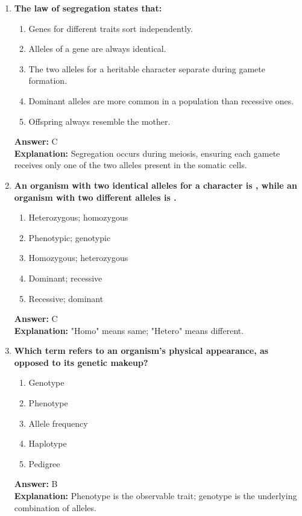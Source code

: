 \documentclass[11pt, a4paper]{article}
\begin{document}
\begin{enumerate}[leftmargin=*, label=\arabic*.]
\item \textbf{The law of segregation states that:}
\begin{enumerate}[label=\Alph*.]
\item Genes for different traits sort independently.
\item Alleles of a gene are always identical.
\item The two alleles for a heritable character separate during gamete formation.
\item Dominant alleles are more common in a population than recessive ones.
\item Offspring always resemble the mother.
\end{enumerate}
\textbf{Answer:} C \\
\textbf{Explanation:} Segregation occurs during meiosis, ensuring each gamete receives only one of the two alleles present in the somatic cells.

\item \textbf{An organism with two identical alleles for a character is \underline{\hspace{1cm}}, while an organism with two different alleles is \underline{\hspace{1cm}}.}
\begin{enumerate}[label=\Alph*.]
\item Heterozygous; homozygous
\item Phenotypic; genotypic
\item Homozygous; heterozygous
\item Dominant; recessive
\item Recessive; dominant
\end{enumerate}
\textbf{Answer:} C \\
\textbf{Explanation:} "Homo" means same; "Hetero" means different.

\item \textbf{Which term refers to an organism's physical appearance, as opposed to its genetic makeup?}
\begin{enumerate}[label=\Alph*.]
\item Genotype
\item Phenotype
\item Allele frequency
\item Haplotype
\item Pedigree
\end{enumerate}
\textbf{Answer:} B \\
\textbf{Explanation:} Phenotype is the observable trait; genotype is the underlying combination of alleles.


\end{enumerate}
\end{document}
